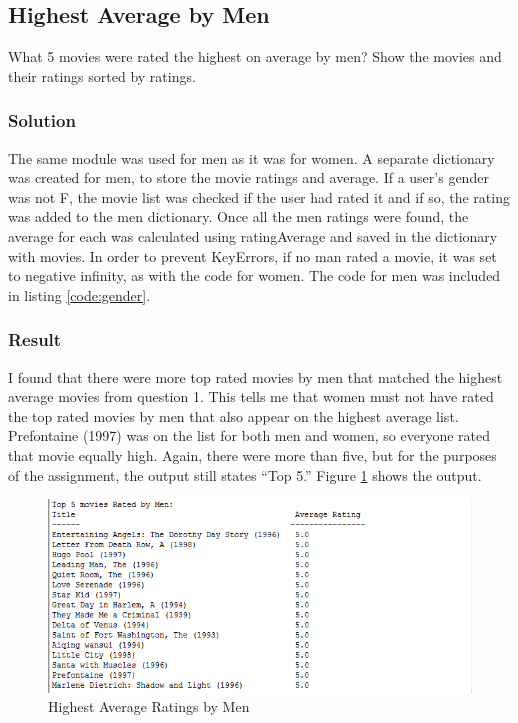 \documentclass[paper=a4, fontsize=11pt]{scrartcl} %
\numberwithin{equation}{section} %
\numberwithin{figure}{section} %
\numberwithin{table}{section} %
\begin{document}

\subsection{Highest Average by Men}
What 5 movies were rated the highest on average by men? 
Show the movies and their ratings sorted by ratings.

\subsubsection{Solution}
The same module was used for men as it was for women.
A separate dictionary was created for men, to store the movie ratings and average.
If a user's gender was not F, the movie list was checked if the user had rated it and if so, the rating was added to the men dictionary.
Once all the men ratings were found, the average for each was calculated using ratingAverage and saved in the dictionary with movies.
In order to prevent KeyErrors, if no man rated a movie, it was set to negative infinity, as with the code for women.\cite{bib:pycookbook}
The code for men was included in listing \ref{code:gender}.

\subsubsection{Result}
I found that there were more top rated movies by men that matched the highest average movies from question 1.
This tells me that women must not have rated the top rated movies by men that also appear on the highest average list. 
Prefontaine (1997) was on the list for both men and women, so everyone rated that movie equally high.
Again, there were more than five, but for the purposes of the assignment, the output still states ``Top 5.''
Figure \ref{fig:men} shows the output.

\begin{figure}[H]
\includegraphics[width=1\textwidth]{pics/topMen}
\caption{Highest Average Ratings by Men}
\label{fig:men}
\end{figure}
\end{document}
